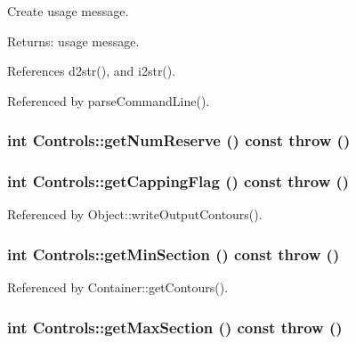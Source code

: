 Create usage message. \begin{Desc}
\item[Returns:]usage message. \end{Desc}


References d2str(), and i2str().

Referenced by parseCommandLine().\hypertarget{classControls_b7738197e6e7658acde1e73bf6519c41}{
\subsubsection[getNumReserve]{\setlength{\rightskip}{0pt plus 5cm}int Controls::getNumReserve () const  throw ()}}
\label{classControls_b7738197e6e7658acde1e73bf6519c41}


\hypertarget{classControls_718c293ec502518db33c8491e8ef84db}{
\subsubsection[getCappingFlag]{\setlength{\rightskip}{0pt plus 5cm}int Controls::getCappingFlag () const  throw ()}}
\label{classControls_718c293ec502518db33c8491e8ef84db}




Referenced by Object::writeOutputContours().\hypertarget{classControls_5f70bbd62a41dd74fee9750acf432a19}{
\subsubsection[getMinSection]{\setlength{\rightskip}{0pt plus 5cm}int Controls::getMinSection () const  throw ()}}
\label{classControls_5f70bbd62a41dd74fee9750acf432a19}




Referenced by Container::getContours().\hypertarget{classControls_afc35dff6349419fe3b0089c78a56127}{
\subsubsection[getMaxSection]{\setlength{\rightskip}{0pt plus 5cm}int Controls::getMaxSection () const  throw ()}}
\label{classControls_afc35dff6349419fe3b0089c78a56127}




